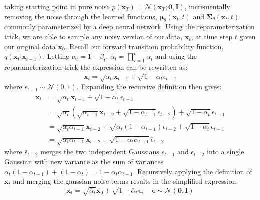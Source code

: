 taking starting point in pure noise $p(\mathbf{x}_T) = \mathcal{N}(\mathbf{x}_T; \mathbf{0}, \mathbf{I})$, incrementally removing the noise through the learned functions, $\mathbf{\mu}_\theta(\mathbf{x}_t, t)$ and $\mathbf{\Sigma}_\theta(\mathbf{x}_t, t)$ commonly parameterized by a deep neural network.
Using the reparameterization trick, we are able to sample any noisy version of our data, $\mathbf{x}_t$, at time step $t$ given our original data $\mathbf{x}_0$. Recall our forward transition probability function, $q(\mathbf{x}_t \vert \mathbf{x}_{t-1})$. Letting $\alpha_t = 1 - \beta_t$, $\bar{\alpha}_t = \prod_{i=1}^t \alpha_i$ and using the reparameterization trick the expression can be rewritten as:
\begin{equation}
    \mathbf{x}_t = \sqrt{\alpha_t} \mathbf{x}_{t-1} + \sqrt{1 - \alpha_t} \epsilon_{t-1}
\end{equation}
where $\epsilon_{t-1} \sim \mathcal{N}(0,1)$. Expanding the recursive definition then gives:
\begin{align}
    \mathbf{x}_t    & = \sqrt{\alpha_t} \mathbf{x}_{t-1} + \sqrt{1 - \alpha_t} \epsilon_{t-1} \\
                    & = \sqrt{\alpha_t} \left(
    \sqrt{\alpha_{t-1}} \mathbf{x}_{t-2} + \sqrt{1 - \alpha_{t-1}} \epsilon_{t-2}
    \right) + \sqrt{1 - \alpha_t} \epsilon_{t-1} \\
                    & = \sqrt{\alpha_t \alpha_{t-1}} \mathbf{x}_{t-2} + \sqrt{\alpha_t(1 - \alpha_{t-1})}\epsilon_{t-2} + \sqrt{1 - \alpha_{t}} \epsilon_{t-1} \\
                    & = \sqrt{\alpha_t \alpha_{t-1}} \mathbf{x}_{t-2} + \sqrt{1 - \alpha_{t}\alpha_{t-1}}\bar{\epsilon}_{t-2}
\end{align}
where $\bar{\epsilon}_{t-2}$ merges the two independent Gaussians $\epsilon_{t-1}$ and $\epsilon_{t-2}$ into a single Gaussian with new variance as the sum of variances $\alpha_t (1 - \alpha_{t-1}) + (1 - \alpha_{t}) = 1 - \alpha_t \alpha_{t-1}$. Recursively applying the definition of $\mathbf{x}_t$ and merging the gaussian noise terms results in the simplified expression:
\begin{equation}
    \mathbf{x}_t = \sqrt{\bar{\alpha}_t}\mathbf{x}_0 + \sqrt{1 - \bar{\alpha}_t} \mathbf{\epsilon}, \quad \mathbf{\epsilon} \sim \mathcal{N}(\mathbf{0}, \mathbf{I})
\end{equation}
